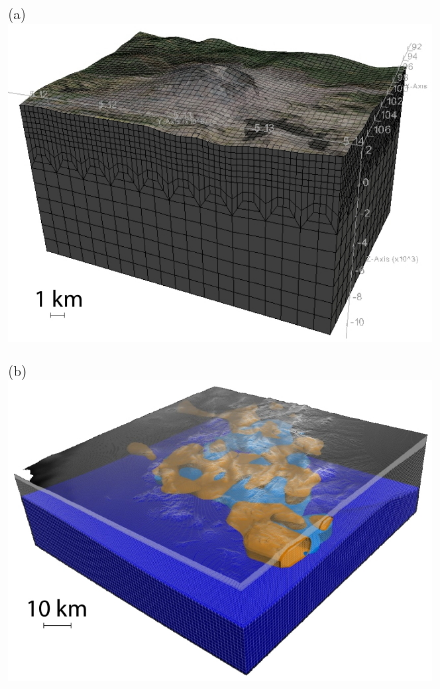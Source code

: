 \documentclass[referee,extra]{gji}
\begin{document}
\begin{figure}
\begin{center}
\begin{minipage}[t]{0.45\textwidth}
\begin{center}
(a)\\
\includegraphics[width=1.\textwidth]{./images/mesh_mountsthelens.jpg}
\end{center}
\end{minipage}
\begin{minipage}[t]{0.45\textwidth}
\begin{center}
(b)\\
\includegraphics[width=1.\textwidth]{./images/mesh_aquila.jpg}
\end{center}
\end{minipage}

\end{center}
\end{figure}
\end{document}
